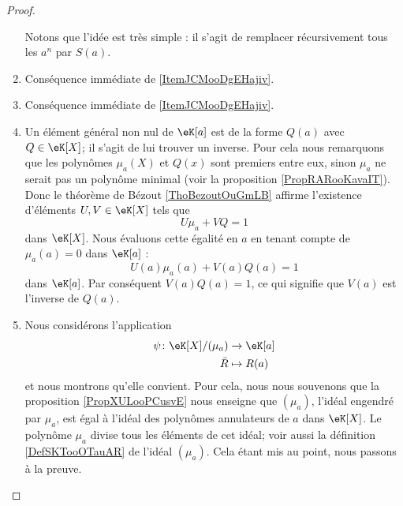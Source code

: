 \begin{proof}
\begin{enumerate}
            Notons que l'idée est très simple : il s'agit de remplacer récursivement tous les \( a^n\) par \( S(a)\).
    \item
        Conséquence immédiate de \ref{ItemJCMooDgEHajiv}.
    \item
        Conséquence immédiate de \ref{ItemJCMooDgEHajiv}.
    \item
        Un élément général non nul de \( \eK[a]\) est de la forme \( Q(a)\) avec \( Q\in\eK[X]\); il s'agit de lui trouver un inverse. Pour cela nous remarquons que les polynômes \( \mu_a(X)\) et \( Q(x)\) sont premiers entre eux, sinon \( \mu_a\) ne serait pas un polynôme minimal (voir la proposition \ref{PropRARooKavaIT}). Donc le théorème de Bézout \ref{ThoBezoutOuGmLB} affirme l'existence d'éléments \( U,V\in \eK[X]\) tels que
        \begin{equation}
            U\mu_a+VQ=1
        \end{equation}
        dans \( \eK[X]\). Nous évaluons cette égalité en \( a\) en tenant compte de \( \mu_a(a)=0\) dans \( \eK[a]\) :
        \begin{equation}
            U(a)\mu_a(a)+V(a)Q(a)=1
        \end{equation}
        dans \( \eK[a]\). Par conséquent \( V(a)Q(a)=1\), ce qui signifie que \( V(a)\) est l'inverse de \( Q(a)\).
        \item
            Nous considérons l'application
            \begin{equation}
                \begin{aligned}
                    \psi\colon \eK[X]/(\mu_a)&\to \eK[a] \\
                    \bar R&\mapsto R(a) 
                \end{aligned}
            \end{equation}
            et nous montrons qu'elle convient. Pour cela, nous nous souvenons que la proposition \ref{PropXULooPCusvE} nous enseigne que \( (\mu_a)\), l'idéal engendré par \( \mu_a\), est égal à l'idéal des polynômes annulateurs de \( a\) dans \( \eK[X]\). Le polynôme \( \mu_a\) divise tous les éléments de cet idéal; voir aussi la définition \ref{DefSKTooOTauAR} de l'idéal \( (\mu_a)\). Cela étant mis au point, nous passons à la preuve.
\end{enumerate}
\end{proof}
